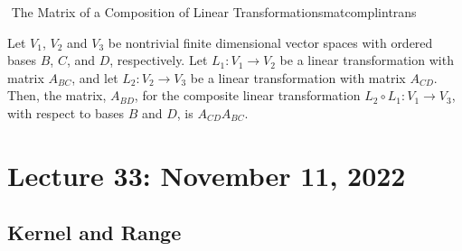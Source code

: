         \begin{theorem}{\Stop\,\,The Matrix of a Composition of Linear Transformations}{matcomplintrans}

            Let \(V_1\), \(V_2\) and \(V_3\) be nontrivial finite dimensional vector spaces with ordered bases \(B\), \(C\), and \(D\), respectively. Let \(L_1:V_1\to V_2\) be a linear transformation with matrix \(A_{BC}\), and let \(L_2:V_2\to V_3\) be a linear transformation with matrix \(A_{CD}\). Then, the matrix, \(A_{BD}\), for the composite linear transformation \(L_2\circ L_1:V_1\to V_3\), with respect to bases \(B\) and \(D\), is \(A_{CD}A_{BC}\).
            
        \end{theorem}

\pagebreak

\section{Lecture 33: November 11, 2022}

    \subsection{Kernel and Range}

